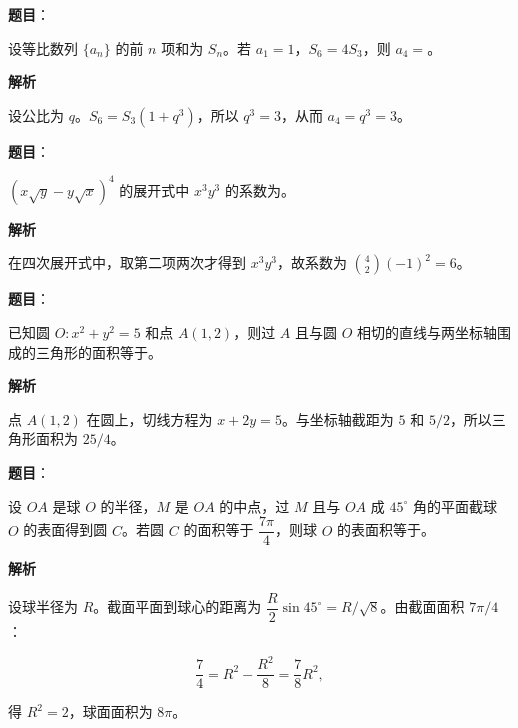 \begin{answer}

\textbf{题目}：

设等比数列 $\{a_n\}$ 的前 $n$ 项和为 $S_n$。若 $a_1=1$，$S_6=4S_3$，则 $a_4=$\gkblank{}。

\textbf{解析}

设公比为 $q$。$S_6=S_3(1+q^3)$，所以 $q^3=3$，从而
$a_4=q^3=3$。


\end{answer}
\begin{answer}

\textbf{题目}：

$(x\sqrt y-y\sqrt x)^4$ 的展开式中 $x^3y^3$ 的系数为\gkblank{}。

\textbf{解析}

在四次展开式中，取第二项两次才得到 $x^3y^3$，故系数为
$\binom42(-1)^2=6$。


\end{answer}
\begin{answer}

\textbf{题目}：

已知圆 $O:x^2+y^2=5$ 和点 $A(1,2)$，则过 $A$ 且与圆 $O$ 相切的直线与两坐标轴围成的三角形的面积等于\gkblank{}。

\textbf{解析}

点 $A(1,2)$ 在圆上，切线方程为 $x+2y=5$。与坐标轴截距为
$5$ 和 $5/2$，所以三角形面积为 $25/4$。


\end{answer}
\begin{answer}

\textbf{题目}：

设 $OA$ 是球 $O$ 的半径，$M$ 是 $OA$ 的中点，过 $M$ 且与 $OA$ 成 $45^\circ$ 角的平面截球 $O$ 的表面得到圆 $C$。若圆 $C$ 的面积等于 $\dfrac{7\pi}{4}$，则球 $O$ 的表面积等于\gkblank{}。

\textbf{解析}

设球半径为 $R$。截面平面到球心的距离为
$\dfrac R2\sin45^\circ=R/\sqrt8$。由截面面积
$7\pi/4$：

\nopagebreak[4]
\[
\frac74=R^2-\frac{R^2}{8}=\frac78R^2,
\]

得 $R^2=2$，球面面积为 $8\pi$。


\end{answer}
